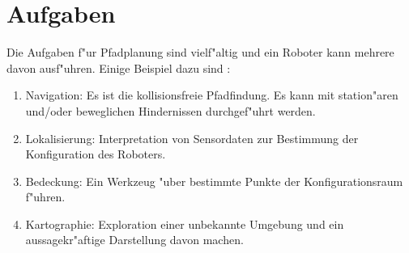 \section{Aufgaben}

Die Aufgaben f"ur Pfadplanung sind vielf"altig und ein Roboter kann mehrere davon ausf"uhren. Einige Beispiel dazu sind \cite[~S. 9,10]{Principles:05}:
\begin{enumerate}
	\item Navigation: Es ist die kollisionsfreie Pfadfindung. Es kann mit station"aren und/oder beweglichen Hindernissen durchgef"uhrt werden.
	\item Lokalisierung: Interpretation von Sensordaten zur Bestimmung der Konfiguration des Roboters.
	\item Bedeckung: Ein Werkzeug "uber bestimmte Punkte der Konfigurationsraum f"uhren.
	\item Kartographie: Exploration einer unbekannte Umgebung und ein aussagekr"aftige Darstellung davon machen.
\end{enumerate}


